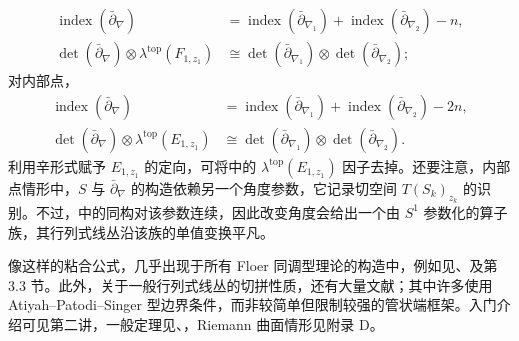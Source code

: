\begin{equation}\label{eq:11.11}
\begin{aligned}
\operatorname{index}(\bar\partial_\nabla)&=\operatorname{index}(\bar\partial_{\nabla_1})+\operatorname{index}(\bar\partial_{\nabla_2})-n,\\
\det(\bar\partial_\nabla)\otimes\lambda^{\mathrm{top}}(F_{1,z_1})&\cong\det(\bar\partial_{\nabla_1})\otimes\det(\bar\partial_{\nabla_2});
\end{aligned}
\end{equation}
对内部点，
\begin{equation}\label{eq:11.12}
\begin{aligned}
\operatorname{index}(\bar\partial_\nabla)&=\operatorname{index}(\bar\partial_{\nabla_1})+\operatorname{index}(\bar\partial_{\nabla_2})-2n,\\
\det(\bar\partial_\nabla)\otimes\lambda^{\mathrm{top}}(E_{1,z_1})&\cong\det(\bar\partial_{\nabla_1})\otimes\det(\bar\partial_{\nabla_2}).
\end{aligned}
\end{equation}
利用辛形式赋予 $E_{1,\allowbreak z_1}$ 的定向，可将中的 $\lambda^{\mathrm{top}}(E_{1,\allowbreak z_1})$ 因子去掉。还要注意，内部点情形中，$S$ 与 $\bar\partial_\nabla$ 的构造依赖另一个角度参数，它记录切空间 $T(S_k)_{z_k}$ 的识别。不过，中的同构对该参数连续，因此改变角度会给出一个由 $S^1$ 参数化的算子族，其行列式线丛沿该族的单值变换平凡。
\begin{note}\label{st:11.3}
像这样的粘合公式，几乎出现于所有 Floer 同调型理论的构造中，例如见、及第 3.3 节。此外，关于一般行列式线丛的切拼性质，还有大量文献；其中许多使用 Atiyah–Patodi–Singer 型边界条件，而非较简单但限制较强的管状端框架。入门介绍可见第二讲，一般定理见、，Riemann 曲面情形见附录 D。
\end{note}

